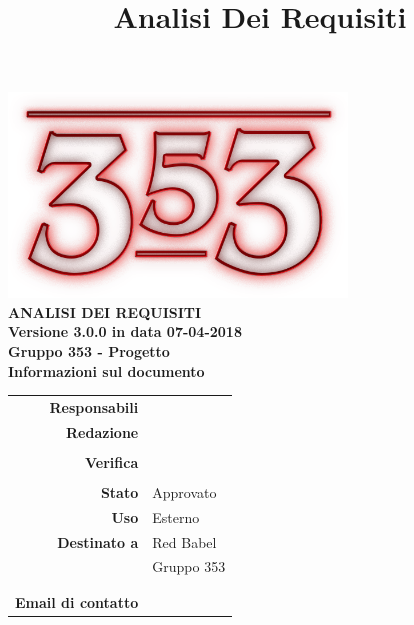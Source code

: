 \documentclass[openany, a4paper, 12pt]{report}
\title{Analisi Dei Requisiti}
\begin{document}
\begin{titlepage}
	\centering
	\vfill
	{
		\bfseries
		\vskip2cm
		\includegraphics[width=9cm]{../../common/images/logo.png} \\
		\vfill
		\Huge{ANALISI DEI REQUISITI}\\
		\vfill
		\Large Versione 3.0.0 in data 07-04-2018\\
		\large Gruppo 353 - Progetto \progetto \\
		\vfill
\normalsize Informazioni sul documento\\

\begin{table}[htbp]
	\centering
	\renewcommand\arraystretch{1.2}
	\begin{tabular}{r|l}
		\hline
		\textbf{Responsabili}	& \Riccardo \\
								
		
		\textbf{Redazione} 		& \Davide\\
								& \Valentina\\
		
		\textbf{Verifica} 		& \Elena\\
								& \Parwinder\\
						
		\textbf{Stato} 			& Approvato\\
		\textbf{Uso}			& Esterno\\
		\textbf{Destinato a}   	& Red Babel\\
								& Gruppo 353\\
								& \Vardanega\\
								& \Cardin\\
		
						
			\textbf{Email di contatto}	& \mailgroup
	\end{tabular}
\end{table}
		\vfill
	}    
\end{titlepage}

\tableofcontents
\listoffigures

\listoftables

\newpage
{}




 
\end{document}
